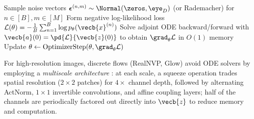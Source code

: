 \documentclass[../../../../master.tex]{subfiles}
\begin{document}
\begin{algorithm}[htbp]
\caption{FFJORD Continuous Normalizing Flow Training Step , }\label{alg:flow:ffjord}
Sample noise vectors $\boldsymbol{\epsilon}^{(n,m)} \sim \Normal(\zeros, \eye_D)$ (or Rademacher) for $n \in [B], m \in [M]$\;
Form negative log-likelihood loss $\mathcal{L}(\theta) = -\frac{1}{B}\sum_{n=1}^B \log p_\theta(\vecb{x}^{(n)})$\;
Solve adjoint ODE backward/forward with $\vecb{a}(0) = \pd{\mathcal{L}}{\vecb{z}(0)}$ to obtain $\grad_\theta \mathcal{L}$ in $O(1)$ memory\;
Update $\theta \leftarrow \mathrm{OptimizerStep}(\theta, \grad_\theta \mathcal{L})$\;
\end{algorithm}

For high-resolution images, discrete flows (RealNVP, Glow) avoid ODE solvers by employing a \emph{multiscale architecture} : at each scale, a squeeze operation trades spatial resolution ($2\times 2$ patches) for $4\times$ channel depth, followed by alternating ActNorm, $1\times 1$ invertible convolutions, and affine coupling layers; half of the channels are periodically factored out directly into $\vecb{z}$ to reduce memory and computation.
\end{document}
